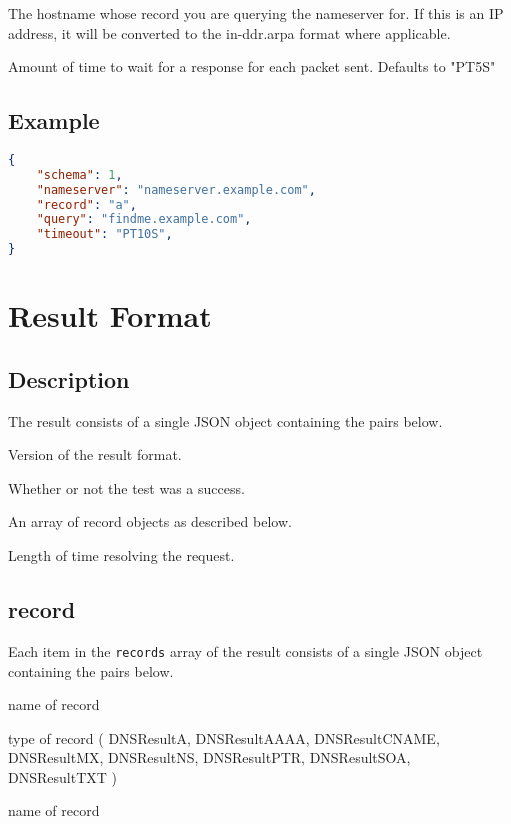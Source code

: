 \documentclass[10pt]{article}
\begin{document}
 The hostname whose record you are querying the
nameserver for.  If this is an IP address, it will be converted to the
in-ddr.arpa format where applicable.

 Amount of time to wait for a response
for each packet sent.  Defaults to "PT5S"


\subsection{Example}
\begin{lstlisting}[language=json]
{
    "schema": 1,
    "nameserver": "nameserver.example.com",
    "record": "a",
    "query": "findme.example.com",
    "timeout": "PT10S",
}
\end{lstlisting}


%
%

\section{Result Format}

\subsection{Description}
The result consists of a single JSON object containing the pairs
below.  \seejson

 Version of the result format.

 Whether or not the test was a success.

 An array of record objects as
described below.

 Length of time resolving the request.

\subsection{record}

Each item in the {\tt records} array of the result consists of a single
JSON object containing the pairs below.  \seejson

 name of record

 type of record ( DNSResultA, DNSResultAAAA,
DNSResultCNAME, DNSResultMX, DNSResultNS, DNSResultPTR, DNSResultSOA,
DNSResultTXT )

 name of record
\end{document}
